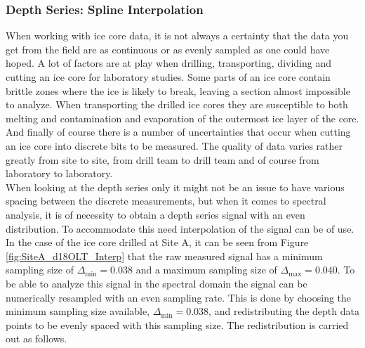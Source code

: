 \documentclass[../../CompleteThesis/Complete_1stDraft.tex]{subfiles}
\begin{document}
\subsubsection[Spline Interpolation]{Depth Series: Spline Interpolation}
When working with ice core data, it is not always a certainty that the data you get from the field are as continuous or as evenly sampled as one could have hoped. A lot of factors are at play when drilling, transporting, dividing and cutting an ice core for laboratory studies. Some parts of an ice core contain brittle zones where the ice is likely to break, leaving a section almost impossible to analyze. When transporting the drilled ice cores they are susceptible to both melting and contamination and evaporation of the outermost ice layer of the core. And finally of course there is a number of uncertainties that occur when cutting an ice core into discrete bits to be measured. The quality of data varies rather greatly from site to site, from drill team to drill team and of course from laboratory to laboratory. \\
When looking at the depth series only it might not be an issue to have various spacing between the discrete measurements, but when it comes to spectral analysis, it is of necessity to obtain a depth series signal with an even distribution. To accommodate this need interpolation of the signal can be of use. In the case of the ice core drilled at Site A, it can be seen from Figure \ref{fig:SiteA_d18OLT_Interp} that the raw measured signal has a minimum sampling size of $\Delta_{\text{min}}=0.038$ and a maximum sampling size of $\Delta_{\text{max}}=0.040$. To be able to analyze this signal in the spectral domain the signal can be numerically resampled with an even sampling rate. This is done by choosing the minimum sampling size available, $\Delta_{\text{min}}=0.038$, and redistributing the depth data points to be evenly spaced with this sampling size. The redistribution is carried out as follows.
\end{document}
